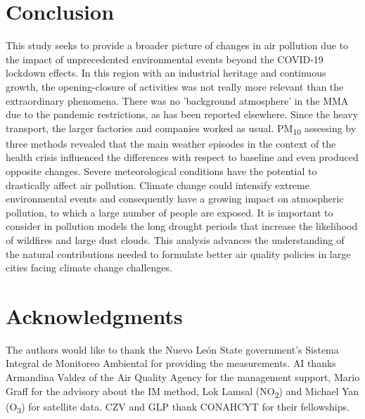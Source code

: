 \documentclass[sn-mathphys-num]{sn-jnl}
\begin{document}
\section{Conclusion}
This study seeks to provide a broader picture of changes in air pollution due to the impact of unprecedented environmental events beyond the COVID-19 lockdown effects. In this region with an industrial heritage and continuous growth, the opening-closure of activities was not really more relevant than the extraordinary phenomena. There was no 'background atmosphere' in the MMA due to the pandemic restrictions, as has been reported elsewhere. Since the heavy transport, the larger factories and companies worked as usual. PM\textsubscript{10} assessing by three methods revealed that the main weather episodes in the context of the health crisis influenced the differences with respect to baseline and even produced opposite changes. Severe meteorological conditions have the potential to drastically affect air pollution. Climate change could intensify extreme environmental events and consequently have a growing impact on atmospheric pollution, to which a large number of people are exposed. It is important to consider in pollution models the long drought periods that increase the likelihood of wildfires and large dust clouds. This analysis advances the understanding of the natural contributions needed to formulate better air quality policies in large cities facing climate change challenges.
\section{Acknowledgments}
The authors would like to thank the Nuevo León State government’s Sistema Integral de Monitoreo Ambiental for providing the measurements. AI thanks Armandina Valdez of the Air Quality Agency for the management support, Mario Graff for the advisory about the IM method, Lok Lamsal (NO\textsubscript{2}) and Michael Yan (O\textsubscript{3}) for satellite data. CZV and GLP thank CONAHCYT for their fellowships. 

\end{document}
